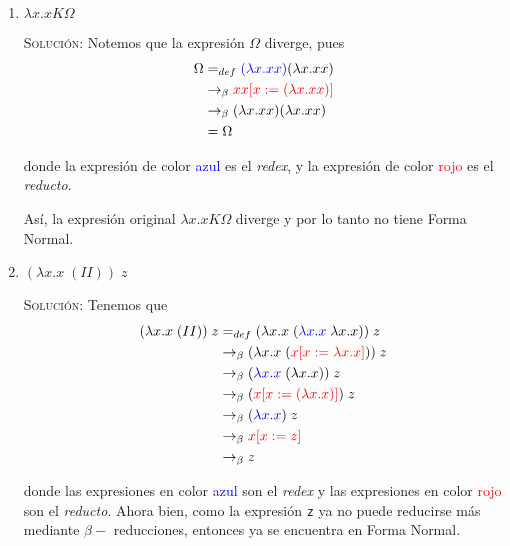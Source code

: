 \documentclass[letterpaper,11pt]{article}
\begin{document}
\begin{enumerate}
    \begin{enumerate}
        \item $\lambda x.xK\Omega$

        \textsc{Solución:} Notemos que la expresión $\Omega$ diverge, pues
        \begin{align*}
            \Omega 
            &=_{def} \textcolor{blue}{(\lambda x.xx)} (\lambda x.xx) \\
            &\rightarrow_{\beta} 
               \textcolor{red}{xx [x := (\lambda x.xx)]} \\
            &\rightarrow_{\beta} (\lambda x.xx)(\lambda x.xx) \\ 
            &= \Omega
        \end{align*}

        donde la expresión de color \textcolor{blue}{azul} es el \textit{redex}, 
        y la expresión de color \textcolor{red}{rojo} es el \textit{reducto}.

        Así, la expresión original $\lambda x.xK\Omega$ diverge y por lo tanto 
        no tiene Forma Normal.

        \item $(\lambda x.x \; (II)) \; z$

        \textsc{Solución:} Tenemos que 
        \begin{align*}
            (\lambda x.x \; (II)) \; z 
            &=_{def} (\lambda x.x \; (\textcolor{blue}{\lambda x.x} \;
                                      \lambda x.x)) \; z \\
            &\rightarrow_{\beta} (\lambda x.x \; 
                                 (\textcolor{red}{x [x := \lambda x.x]})) 
                                 \; z \\
            &\rightarrow_{\beta}
            (\textcolor{blue}{\lambda x.x} \; (\lambda x.x)) \; z \\ 
            &\rightarrow_{\beta} (\textcolor{red}{x [x := (\lambda x.x)]}) \; z \\ 
            &\rightarrow_{\beta} (\textcolor{blue}{\lambda x.x}) \; z \\
            &\rightarrow_{\beta} \textcolor{red}{x [x := z]} \\
            &\rightarrow_{\beta} z
        \end{align*}

        donde las expresiones en color \textcolor{blue}{azul} son el 
        \textit{redex} y las expresiones en color \textcolor{red}{rojo} son el 
        \textit{reducto}. Ahora bien, como la expresión \texttt{z} ya no puede
        reducirse más mediante $\beta-$ reducciones, entonces ya se encuentra 
        en Forma Normal.


\end{enumerate}
\end{enumerate}
\end{document}

